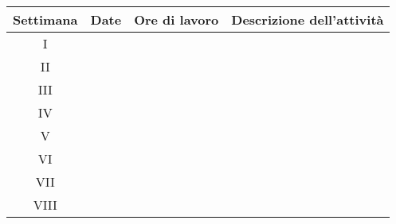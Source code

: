 
\begin{tabular}{|c|c|c|p{10cm}|}
	\hline
	\textbf{Settimana} & \textbf{Date} & \textbf{Ore di lavoro} & \textbf{Descrizione dell'attività} \\\hline
	I &  &  & \\ \hline
	II &  &  &  \\ \hline
	III &  &  &  \\ \hline
	IV &  &  &  \\ \hline
	V &  &  & \\ \hline
	VI &  &  & \\ \hline
	VII &  &  & \\ \hline
	VIII &  &  & \\ \hline
\end{tabular}
